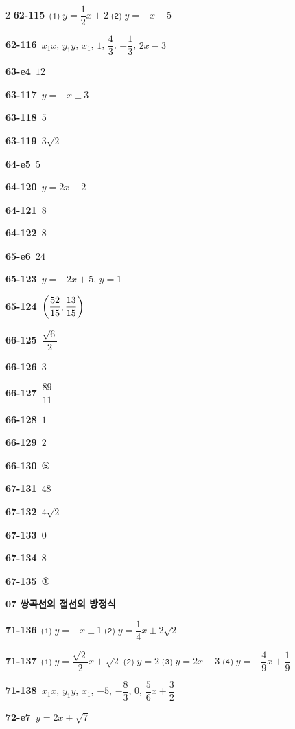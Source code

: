 \documentclass[10pt,a4paper]{article}
\begin{document}
\begin{multicols}{2}
\noindent\textbf{62-115}\ ⑴ $y=\dfrac{1}{2}x+2$ ⑵ $y=-x+5$\par
\noindent\textbf{62-116}\ $x_1x$, $y_1y$, $x_1$, $1$, $\dfrac{4}{3}$, $-\dfrac{1}{3}$, $2x-3$\par
\noindent\textbf{63-e4}\ $12$\par
\noindent\textbf{63-117}\ $y=-x\pm3$\par
\noindent\textbf{63-118}\ $5$\par
\noindent\textbf{63-119}\ $3\sqrt{2}$\par
\noindent\textbf{64-e5}\ $5$\par
\noindent\textbf{64-120}\ $y=2x-2$\par
\noindent\textbf{64-121}\ $8$\par
\noindent\textbf{64-122}\ $8$\par
\noindent\textbf{65-e6}\ $24$\par
\noindent\textbf{65-123}\ $y=-2x+5$, $y=1$\par
\noindent\textbf{65-124}\ $\left(\dfrac{52}{15}{,}\mkern3mu\mathopen{}\dfrac{13}{15}\right)$\par
\noindent\textbf{66-125}\ $\dfrac{\sqrt{6}}{2}$\par
\noindent\textbf{66-126}\ $3$\par
\noindent\textbf{66-127}\ $\dfrac{89}{11}$\par
\noindent\textbf{66-128}\ $1$\par
\noindent\textbf{66-129}\ $2$\par
\noindent\textbf{66-130}\ ⑤\par
\noindent\textbf{67-131}\ $48$\par
\noindent\textbf{67-132}\ $4\sqrt{2}$\par
\noindent\textbf{67-133}\ $0$\par
\noindent\textbf{67-134}\ $8$\par
\noindent\textbf{67-135}\ ①\par
\noindent\textbf{07 쌍곡선의 접선의 방정식}\par\smallskip
\noindent\textbf{71-136}\ ⑴ $y=-x\pm1$ ⑵ $y=\dfrac{1}{4}x\pm2\sqrt{2}$\par
\noindent\textbf{71-137}\ ⑴ $y=\dfrac{\sqrt{2}}{2}x+\sqrt{2}$ ⑵ $y=2$ ⑶ $y=2x-3$ ⑷ $y=-\dfrac{4}{9}x+\dfrac{1}{9}$\par
\noindent\textbf{71-138}\ $x_1x$, $y_1y$, $x_1$, $-5$, $-\dfrac{8}{3}$, $0$, $\dfrac{5}{6}x+\dfrac{3}{2}$\par
\noindent\textbf{72-e7}\ $y=2x\pm\sqrt{7}$\par

\end{multicols}
\end{document}
